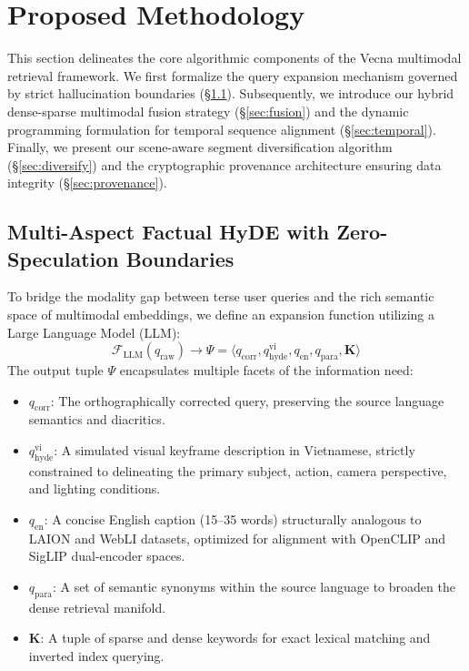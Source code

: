 \section{Proposed Methodology}\label{sec:method}

This section delineates the core algorithmic components of the Vecna multimodal retrieval framework. We first formalize the query expansion mechanism governed by strict hallucination boundaries (\S\ref{sec:hyde}). Subsequently, we introduce our hybrid dense-sparse multimodal fusion strategy (\S\ref{sec:fusion}) and the dynamic programming formulation for temporal sequence alignment (\S\ref{sec:temporal}). Finally, we present our scene-aware segment diversification algorithm (\S\ref{sec:diversify}) and the cryptographic provenance architecture ensuring data integrity (\S\ref{sec:provenance}).

\subsection{Multi-Aspect Factual HyDE with Zero-Speculation Boundaries}\label{sec:hyde}

To bridge the modality gap between terse user queries and the rich semantic space of multimodal embeddings, we define an expansion function utilizing a Large Language Model (LLM):
\begin{equation}
\mathcal{F}_{\text{LLM}}(q_{\text{raw}}) \rightarrow \Psi = \langle q_{\text{corr}}, q_{\text{hyde}}^{\text{vi}}, q_{\text{en}}, q_{\text{para}}, \mathbf{K} \rangle
\end{equation}
The output tuple $\Psi$ encapsulates multiple facets of the information need:
\begin{itemize}
    \item $q_{\text{corr}}$: The orthographically corrected query, preserving the source language semantics and diacritics.
    \item $q_{\text{hyde}}^{\text{vi}}$: A simulated visual keyframe description in Vietnamese, strictly constrained to delineating the primary subject, action, camera perspective, and lighting conditions.
    \item $q_{\text{en}}$: A concise English caption (15--35 words) structurally analogous to LAION and WebLI datasets, optimized for alignment with OpenCLIP and SigLIP dual-encoder spaces.
    \item $q_{\text{para}}$: A set of semantic synonyms within the source language to broaden the dense retrieval manifold.
    \item $\mathbf{K}$: A tuple of sparse and dense keywords for exact lexical matching and inverted index querying.
\end{itemize}

